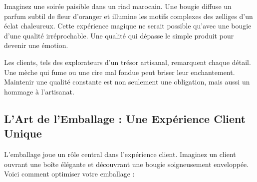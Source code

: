 \documentclass[11pt,fleqn,onecolumn,oneside]{book}
\begin{document}
Imaginez une soirée paisible dans un riad marocain. Une bougie diffuse un parfum subtil de fleur d’oranger et illumine les motifs complexes des zelliges d’un éclat chaleureux. Cette expérience magique ne serait possible qu’avec une bougie d’une qualité irréprochable. Une qualité qui dépasse le simple produit pour devenir une émotion.

\begin{corollary}
Les clients, tels des explorateurs d’un trésor artisanal, remarquent chaque détail. Une mèche qui fume ou une cire mal fondue peut briser leur enchantement. Maintenir une qualité constante est non seulement une obligation, mais aussi un hommage à l’artisanat.
\end{corollary}

\subsection*{L’Art de l’Emballage : Une Expérience Client Unique}

L’emballage joue un rôle central dans l’expérience client. Imaginez un client ouvrant une boîte élégante et découvrant une bougie soigneusement enveloppée. Voici comment optimiser votre emballage :
\end{document}
